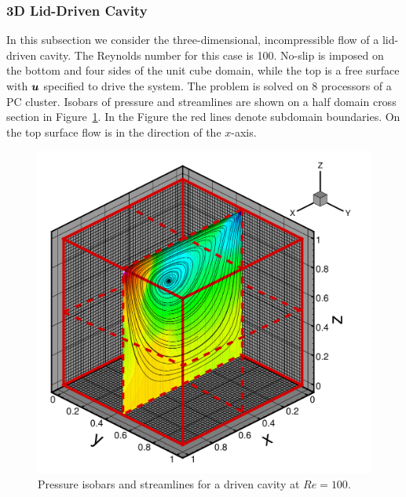 



\subsubsection{3D Lid-Driven Cavity}
In this subsection we consider the three-dimensional, incompressible flow of a lid-driven cavity.  The Reynolds number for this case is 100.  No-slip is imposed on the bottom and four sides of the unit cube domain, while the top is a free surface with $\mbox{{\boldmath $u$}}$ specified to drive the system.  The problem is solved on 8 processors of a PC cluster. Isobars of pressure and streamlines are shown on a half domain cross section in Figure~\ref{fig:3D_cavity}.  In the Figure the red lines denote subdomain boundaries. On the top surface flow is in the direction of the $x$-axis.

\begin{figure}[hbtp]
  \begin{center}
    \includegraphics[width=.6\textwidth]{figures/cmg/flowfield-3D}
    \caption{Pressure isobars and streamlines for a driven cavity at $Re=100$.}
    \label{fig:3D_cavity}
  \end{center}
\end{figure}
    

